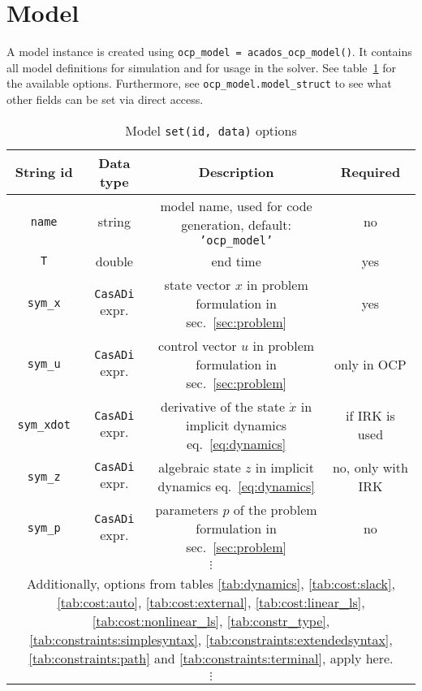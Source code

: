 \documentclass[english]{article}
\newcommand{\code}[1]{\texttt{#1}}
\newcommand{\str}[1]{\texttt{'#1'}}
\newcommand{\casadi}{\texttt{CasADi}}
\newcommand{\mandatory}{yes}
\newcommand{\optional}{no}
\begin{document}
\section{Model}\label{sec:model}
%
A model instance is created using \code{ocp\_model = acados\_ocp\_model()}. It contains all model definitions for simulation and for usage in the solver.
See table~\ref{tab:model:options} for the available options.
Furthermore, see \code{ocp\_model.model\_struct} to see what other fields can be set via direct access.
%
\begin{table}
    \centering
    \caption{Model \code{set(id, data)} options}
    \label{tab:model:options}
    \begin{tabular}{cccc}
        \toprule
        String id & Data type & Description & Required\\
        \midrule
        \code{name} & string & model name, used for code generation, default: \str{ocp\_model} & \optional \\
        \code{T} & double & end time & \mandatory \\
        \code{sym\_x} & \casadi{} expr. & state vector $x$ in problem formulation in sec.~\ref{sec:problem} & \mandatory \\
        \code{sym\_u} & \casadi{} expr. & control vector $u$ in problem formulation in sec.~\ref{sec:problem} & only in OCP \\
        \code{sym\_xdot} & \casadi{} expr. & derivative of the state $\dot{x}$ in implicit dynamics eq.~\eqref{eq:dynamics} & if IRK is used \\
        \code{sym\_z} & \casadi{} expr. & algebraic state $z$ in implicit dynamics eq.~\eqref{eq:dynamics} & \optional, only with IRK \\
        \code{sym\_p} & \casadi{} expr. & parameters $p$ of the problem formulation in sec.~\ref{sec:problem} & \optional \\
        \multicolumn{4}{c}{$\vdots$}\\
        \multicolumn{4}{c}{Additionally, options from tables \ref{tab:dynamics}, \ref{tab:cost:slack}, \ref{tab:cost:auto}, \ref{tab:cost:external}, \ref{tab:cost:linear_ls}, \ref{tab:cost:nonlinear_ls}, \ref{tab:constr_type}, \ref{tab:constraints:simplesyntax}, \ref{tab:constraints:extendedsyntax}, \ref{tab:constraints:path} and \ref{tab:constraints:terminal}, apply here.}\\
        \multicolumn{4}{c}{$\vdots$}\\
        \bottomrule
    \end{tabular}%
\end{table}%
%
\end{document}
